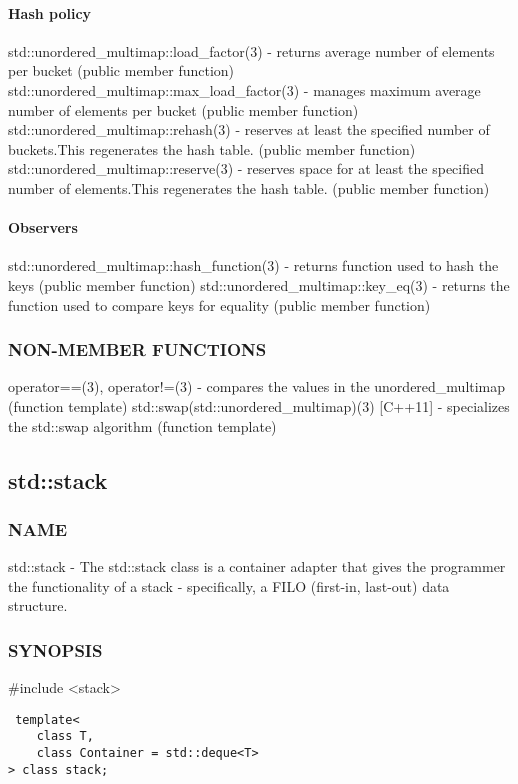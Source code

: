 \paragraph{Hash policy}
std::unordered\_multimap::load\_factor(3) - returns average number of elements per bucket  (public member function)
std::unordered\_multimap::max\_load\_factor(3) - manages maximum average number of elements per bucket  (public member function)
std::unordered\_multimap::rehash(3) - reserves at least the specified number of buckets.This regenerates the hash table.  (public member function)
std::unordered\_multimap::reserve(3) - reserves space for at least the specified number of elements.This regenerates the hash table.  (public member function)
\paragraph{Observers}
std::unordered\_multimap::hash\_function(3) - returns function used to hash the keys   (public member function)
std::unordered\_multimap::key\_eq(3) - returns the function used to compare keys for equality   (public member function)

\subsubsection{NON-MEMBER FUNCTIONS}
operator==(3), operator!=(3) - compares the values in the unordered\_multimap   (function template)
std::swap(std::unordered\_multimap)(3) [C++11] - specializes the std::swap algorithm   (function template)


\subsection{std::stack}

\subsubsection{NAME}
std::stack - The std::stack class is a container adapter that gives the programmer the functionality of a stack - specifically, a FILO (first-in, last-out) data structure.

\subsubsection{SYNOPSIS}
\#include <stack>

\begin{lstlisting}
 template<
    class T,
    class Container = std::deque<T>
> class stack;
\end{lstlisting}


